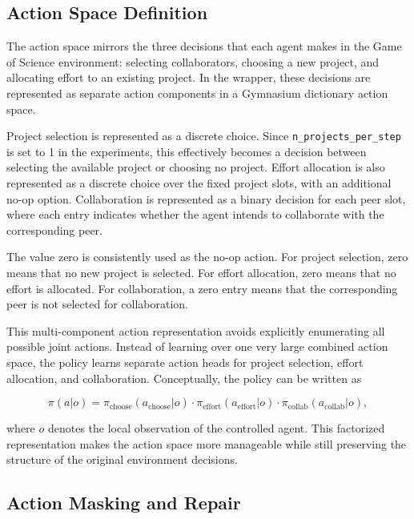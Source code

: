 \documentclass[english,bachelor]{hsluthesis}
\begin{document}
\subsection{Action Space Definition}

The action space mirrors the three decisions that each agent makes in the Game of Science environment: selecting collaborators, choosing a new project, and allocating effort to an existing project. In the wrapper, these decisions are represented as separate action components in a Gymnasium dictionary action space.

Project selection is represented as a discrete choice. Since \texttt{n\_projects\_per\_step} is set to 1 in the experiments, this effectively becomes a decision between selecting the available project or choosing no project. Effort allocation is also represented as a discrete choice over the fixed project slots, with an additional no-op option. Collaboration is represented as a binary decision for each peer slot, where each entry indicates whether the agent intends to collaborate with the corresponding peer.

The value zero is consistently used as the no-op action. For project selection, zero means that no new project is selected. For effort allocation, zero means that no effort is allocated. For collaboration, a zero entry means that the corresponding peer is not selected for collaboration.

This multi-component action representation avoids explicitly enumerating all possible joint actions. Instead of learning over one very large combined action space, the policy learns separate action heads for project selection, effort allocation, and collaboration. Conceptually, the policy can be written as

\begin{equation}
\pi(a|o) =
\pi_{\text{choose}}(a_{\text{choose}}|o)
\cdot
\pi_{\text{effort}}(a_{\text{effort}}|o)
\cdot
\pi_{\text{collab}}(a_{\text{collab}}|o),
\end{equation}

where $o$ denotes the local observation of the controlled agent. This factorized representation makes the action space more manageable while still preserving the structure of the original environment decisions.

\subsection{Action Masking and Repair}
\end{document}
